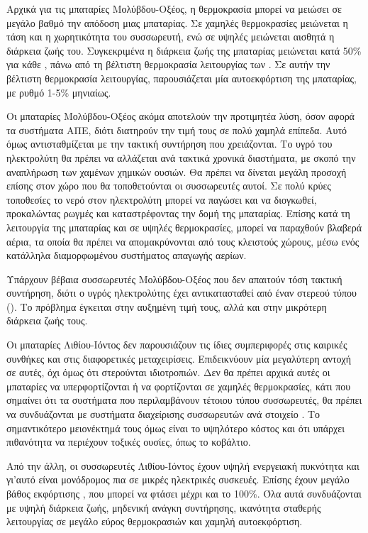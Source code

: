 \documentclass[12pt]{report}
\begin{document}
Αρχικά για τις μπαταρίες Μολύβδου-Οξέος, η θερμοκρασία μπορεί να μειώσει σε μεγάλο βαθμό την απόδοση μιας μπαταρίας. Σε χαμηλές θερμοκρασίες μειώνεται η τάση και η χωρητικότητα του συσσωρευτή, ενώ σε υψηλές μειώνεται αισθητά η 
διάρκεια ζωής του. Συγκεκριμένα η διάρκεια ζωής της μπαταρίας μειώνεται κατά 50\% για κάθε {}, πάνω από τη βέλτιστη θερμοκρασία λειτουργίας των {}. Σε αυτήν την βέλτιστη θερμοκρασία 
λειτουργίας, παρουσιάζεται μία αυτοεκφόρτιση της μπαταρίας, με ρυθμό 1-5\% μηνιαίως.

Οι μπαταρίες Μολύβδου-Οξέος ακόμα αποτελούν την προτιμητέα λύση, όσον αφορά τα συστήματα ΑΠΕ, διότι διατηρούν την τιμή τους σε πολύ χαμηλά επίπεδα. Αυτό όμως αντισταθμίζεται με την τακτική συντήρηση που χρειάζονται. 
Το υγρό του ηλεκτρολύτη θα πρέπει να αλλάζεται ανά τακτικά χρονικά διαστήματα, με σκοπό την αναπλήρωση των χαμένων χημικών ουσιών. Θα πρέπει να δίνεται μεγάλη προσοχή επίσης στον χώρο που θα τοποθετούνται οι συσσωρευτές αυτοί.
Σε πολύ κρύες τοποθεσίες το νερό στον ηλεκτρολύτη μπορεί να παγώσει και να διογκωθεί, προκαλώντας ρωγμές και καταστρέφοντας την δομή της μπαταρίας. Επίσης κατά τη λειτουργία της μπαταρίας και σε υψηλές θερμοκρασίες, μπορεί να
παραχθούν βλαβερά αέρια, τα οποία θα πρέπει να απομακρύνονται από τους κλειστούς χώρους, μέσω ενός κατάλληλα διαμορφωμένου συστήματος απαγωγής αερίων.
 
Υπάρχουν βέβαια συσσωρευτές Μολύβδου-Οξέος που δεν απαιτούν τόση τακτική συντήρηση, διότι ο υγρός ηλεκτρολύτης έχει αντικατασταθεί από έναν στερεού τύπου ({}). Το πρόβλημα έγκειται στην αυξημένη τιμή τους, αλλά
και στην μικρότερη διάρκεια ζωής τους. 

Οι μπαταρίες Λιθίου-Ιόντος δεν παρουσιάζουν τις ίδιες συμπεριφορές στις καιρικές συνθήκες και στις διαφορετικές μεταχειρίσεις. Επιδεικνύουν μία μεγαλύτερη αντοχή σε αυτές, όχι όμως ότι στερούνται ιδιοτροπιών. 
Δεν θα πρέπει αρχικά αυτές οι μπαταρίες να υπερφορτίζονται ή να φορτίζονται σε χαμηλές θερμοκρασίες, κάτι που σημαίνει ότι τα συστήματα που περιλαμβάνουν τέτοιου τύπου συσσωρευτές, θα πρέπει να συνδυάζονται με συστήματα
διαχείρισης συσσωρευτών ανά στοιχείο {}. Το σημαντικότερο μειονέκτημά τους όμως είναι το υψηλότερο κόστος και ότι υπάρχει πιθανότητα να περιέχουν τοξικές ουσίες, όπως το κοβάλτιο.

Από την άλλη, οι συσσωρευτές Λιθίου-Ιόντος έχουν υψηλή ενεργειακή πυκνότητα και γι'αυτό είναι μονόδρομος πια σε μικρές ηλεκτρικές συσκευές. Επίσης έχουν μεγάλο βάθος εκφόρτισης {}, που μπορεί
να φτάσει μέχρι και το 100\%. Όλα αυτά συνδυάζονται με υψηλή διάρκεια ζωής, μηδενική ανάγκη συντήρησης, ικανότητα σταθερής λειτουργίας σε μεγάλο εύρος θερμοκρασιών και χαμηλή αυτοεκφόρτιση.
\end{document}
